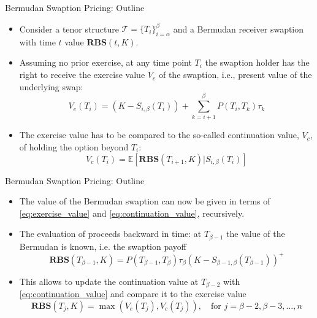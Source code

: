 \documentclass{beamer}
\begin{document}
\begin{frame}{Bermudan Swaption Pricing: Outline}
	\begin{itemize}
	\item<1-> Consider a tenor structure $\mathcal{T}=\{T_i\}^\beta_{i=\alpha}$ and a Bermudan receiver swaption with time $t$ value $\textbf{RBS}(t,K)$.
	\item<2-> Assuming no prior exercise, at any time point $T_i$ the swaption holder has the right to receive the exercise value $V_e$ of the swaption, i.e., present value of the underlying swap:
	\begin{equation}
	V_e(T_i)=(K-S_{i,\beta}(T_i))+\sum^\beta_{k=i+1} P(T_i,T_k)\tau_k
	\label{eq:exercise_value}
	\end{equation}
	\item<3-> The exercise value has to be compared to the so-called continuation value, $V_c$, of holding the option beyond $T_i$:
	\begin{equation}
	V_c(T_i)=\mathbb{E}[\textbf{RBS}(T_{i+1},K)|S_{i,\beta}(T_i)]
	\label{eq:continuation_value}
	\end{equation}
\end{itemize}
\end{frame}

\begin{frame}{Bermudan Swaption Pricing: Outline}
	\begin{itemize}
		\item<1-> The value of the Bermudan swaption can now be given in terms of \cref{eq:exercise_value} and \cref{eq:continuation_value}, recursively.
		\item<2-> The evaluation of proceeds backward in time: at $T_{\beta-1}$
		the value of the Bermudan is known, i.e. the swaption payoff
		\begin{equation*}
			\textbf{RBS}(T_{\beta-1},K)=P(T_{\beta-1},T_\beta)\tau_\beta(K-S_{\beta-1,\beta}(T_{\beta-1}))^+
		\end{equation*}
		\item <3->This allows to update the continuation value at $T_{\beta-2}$ with \cref{eq:continuation_value} and compare it to the exercise value
		\begin{equation*}
			\textbf{RBS}(T_j,K)=\max(V_e(T_j),V_c(T_j)),\quad\text{for }j=\beta-2,\beta-3,\ldots,n
		\end{equation*}
	\end{itemize}
\end{frame}
\end{document}
